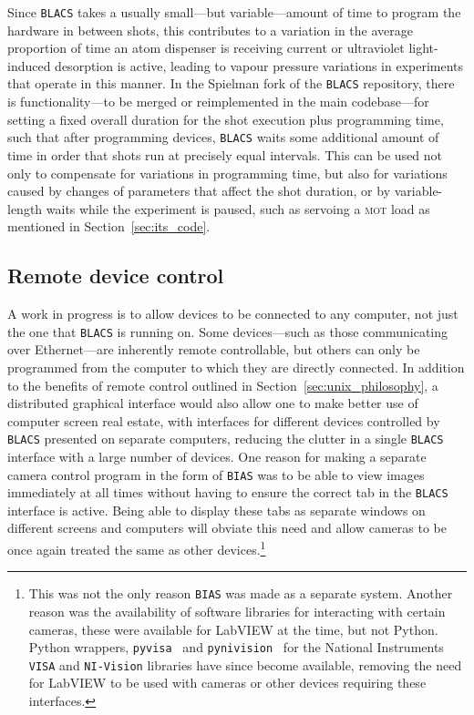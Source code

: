 Since \texttt{BLACS} takes a usually small---but variable---amount of time to program the hardware in between shots, this contributes to a variation in the average proportion of time an atom dispenser is receiving current or ultraviolet light-induced desorption is active, leading to vapour pressure variations in experiments that operate in this manner. In the Spielman fork of the \texttt{BLACS} repository, there is functionality---to be merged or reimplemented in the main codebase---for setting a fixed overall duration for the shot execution plus programming time, such that after programming devices, \texttt{BLACS} waits some additional amount of time in order that shots run at precisely equal intervals. This can be used not only to compensate for variations in programming time, but also for variations caused by changes of parameters that affect the shot duration, or by variable-length waits while the experiment is paused, such as servoing a \textsc{mot} load as mentioned in Section~\ref{sec:its_code}.

\subsection{Remote device control}

A work in progress is to allow devices to be connected to any computer, not just the one that \texttt{BLACS} is running on. Some devices---such as those communicating over Ethernet---are inherently remote controllable, but others can only be programmed from the computer to which they are directly connected. In addition to the benefits of remote control outlined in Section~\ref{sec:unix_philosophy}, a distributed graphical interface would also allow one to make better use of computer screen real estate, with interfaces for different devices controlled by \texttt{BLACS} presented on separate computers, reducing the clutter in a single \texttt{BLACS} interface with a large number of devices. One reason for making a separate camera control program in the form of \texttt{BIAS} was to be able to view images immediately at all times without having to ensure the correct tab in the \texttt{BLACS} interface is active. Being able to display these tabs as separate windows on different screens and computers will obviate this need and allow cameras to be once again treated the same as other devices.\footnote{This was not the only reason \texttt{BIAS} was made as a separate system. Another reason was the availability of software libraries for interacting with certain cameras, these were available for LabVIEW at the time, but not Python. Python wrappers, \texttt{pyvisa}~\cite{torsten_bronger_pyvisa_2018} and \texttt{pynivision}~\cite{peter_johnson_frc_team_294_pynivision_2015} for the National Instruments \texttt{VISA} and \texttt{NI-Vision} libraries have since become available, removing the need for LabVIEW to be used with cameras or other devices requiring these interfaces.}


